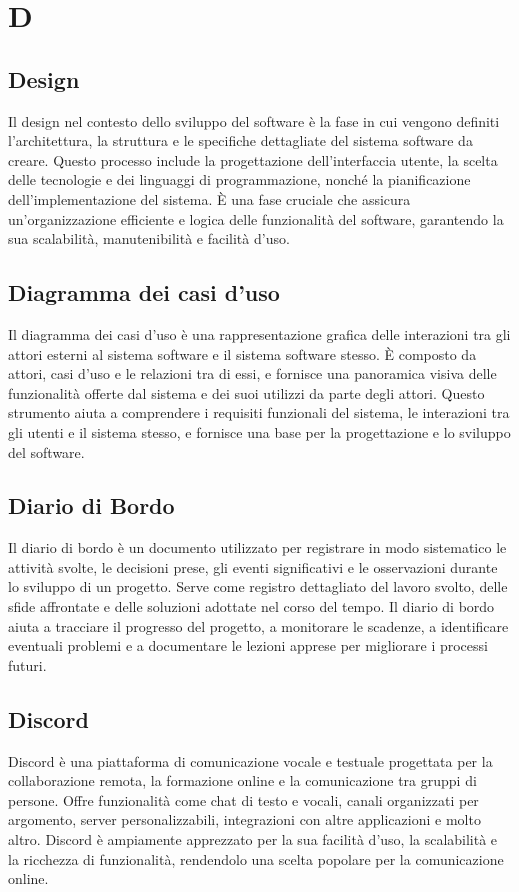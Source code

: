 \section*{D} 
\subsection*{Design} 
Il design nel contesto dello sviluppo del software è la fase in cui vengono definiti l'architettura, la struttura e le specifiche dettagliate del sistema software da creare. Questo processo include la progettazione dell'interfaccia utente, la scelta delle tecnologie e dei linguaggi di programmazione, nonché la pianificazione dell'implementazione del sistema. È una fase cruciale che assicura un'organizzazione efficiente e logica delle funzionalità del software, garantendo la sua scalabilità, manutenibilità e facilità d'uso.
\subsection*{Diagramma dei casi d'uso} 
Il diagramma dei casi d'uso è una rappresentazione grafica delle interazioni tra gli attori esterni al sistema software e il sistema software stesso. È composto da attori, casi d'uso e le relazioni tra di essi, e fornisce una panoramica visiva delle funzionalità offerte dal sistema e dei suoi utilizzi da parte degli attori. Questo strumento aiuta a comprendere i requisiti funzionali del sistema, le interazioni tra gli utenti e il sistema stesso, e fornisce una base per la progettazione e lo sviluppo del software.
\subsection*{Diario di Bordo} 
Il diario di bordo è un documento utilizzato per registrare in modo sistematico le attività svolte, le decisioni prese, gli eventi significativi e le osservazioni durante lo sviluppo di un progetto. Serve come registro dettagliato del lavoro svolto, delle sfide affrontate e delle soluzioni adottate nel corso del tempo. Il diario di bordo aiuta a tracciare il progresso del progetto, a monitorare le scadenze, a identificare eventuali problemi e a documentare le lezioni apprese per migliorare i processi futuri.
\subsection*{Discord} 
Discord è una piattaforma di comunicazione vocale e testuale progettata per la collaborazione remota, la formazione online e la comunicazione tra gruppi di persone. Offre funzionalità come chat di testo e vocali, canali organizzati per argomento, server personalizzabili, integrazioni con altre applicazioni e molto altro. Discord è ampiamente apprezzato per la sua facilità d'uso, la scalabilità e la ricchezza di funzionalità, rendendolo una scelta popolare per la comunicazione online.
